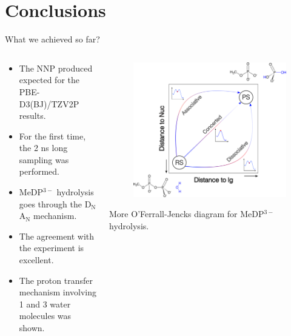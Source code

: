 \documentclass[11pt,t]{beamer}
\begin{document}
\section{Conclusions}
\begin{frame}{What we achieved so far?}
	\begin{columns}[t]
		\begin{column}{.55\textwidth}
		\vspace{-10pt}
		\small
		\begin{itemize}
			\item The NNP produced expected for the PBE-D3(BJ)/TZV2P results.
			\item For the first time, the 2 ns long sampling was performed.
			\item MeDP$^{3-}$ hydrolysis goes through the D$_\text{N}$A$_\text{N}$ mechanism.
			\item The agreement with the experiment is excellent.
			\item The proton transfer mechanism involving 1 and 3 water molecules was shown.
		\end{itemize}	
		\end{column}
		\begin{column}{.45\textwidth}
			\vspace{-25pt}
			\begin{figure}
				\centering
				\includegraphics[width=1.0\textwidth]{Figures/conclusions_mfj_plot.png}
			\end{figure}
			\centering
			\scriptsize
			More O'Ferrall-Jencks diagram for MeDP$^{3-}$ hydrolysis.
		\end{column}
	\end{columns}
\end{frame}
\end{document}
